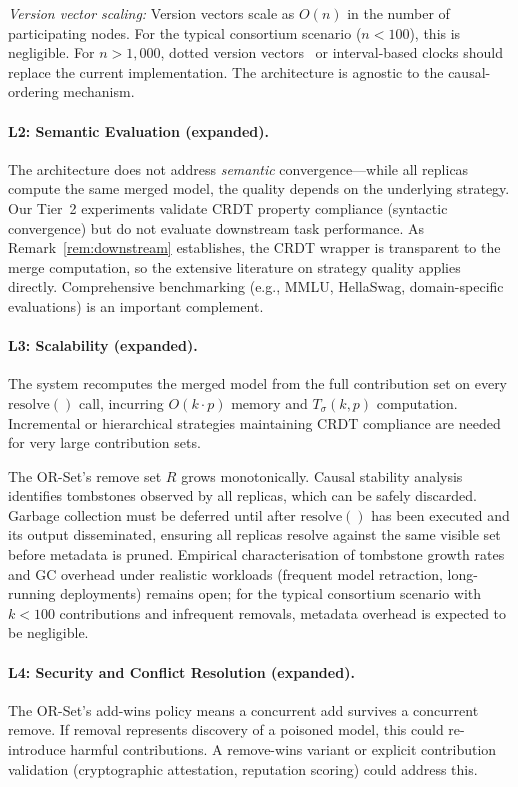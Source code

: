 \documentclass[10pt,letterpaper]{article}
\begin{document}
\emph{Version vector scaling:} Version vectors scale as $O(n)$ in the number of participating nodes.
For the typical consortium scenario ($n < 100$), this is negligible.
For $n > 1{,}000$, dotted version vectors~\cite{preguica2018conflict} or interval-based clocks should replace the current implementation.
The architecture is agnostic to the causal-ordering mechanism.

\paragraph{L2: Semantic Evaluation (expanded).}
The architecture does not address \emph{semantic} convergence---while all replicas compute the same merged model, the quality depends on the underlying strategy.
Our Tier~2 experiments validate CRDT property compliance (syntactic convergence) but do not evaluate downstream task performance.
As Remark~\ref{rem:downstream} establishes, the CRDT wrapper is transparent to the merge computation, so the extensive literature on strategy quality applies directly.
Comprehensive benchmarking (e.g., MMLU, HellaSwag, domain-specific evaluations) is an important complement.

\paragraph{L3: Scalability (expanded).}
The system recomputes the merged model from the full contribution set on every $\mathrm{resolve}()$ call, incurring $O(k \cdot p)$ memory and $T_\sigma(k,p)$ computation.
Incremental or hierarchical strategies maintaining CRDT compliance are needed for very large contribution sets.

The OR-Set's remove set $R$ grows monotonically.
Causal stability analysis~\cite{baquero2014making} identifies tombstones observed by all replicas, which can be safely discarded.
Garbage collection must be deferred until after $\mathrm{resolve}()$ has been executed and its output disseminated, ensuring all replicas resolve against the same visible set before metadata is pruned.
Empirical characterisation of tombstone growth rates and GC overhead under realistic workloads (frequent model retraction, long-running deployments) remains open; for the typical consortium scenario with $k < 100$ contributions and infrequent removals, metadata overhead is expected to be negligible.

\paragraph{L4: Security and Conflict Resolution (expanded).}
The OR-Set's add-wins policy means a concurrent add survives a concurrent remove.
If removal represents discovery of a poisoned model, this could re-introduce harmful contributions.
A remove-wins variant or explicit contribution validation (cryptographic attestation, reputation scoring) could address this.
\end{document}
